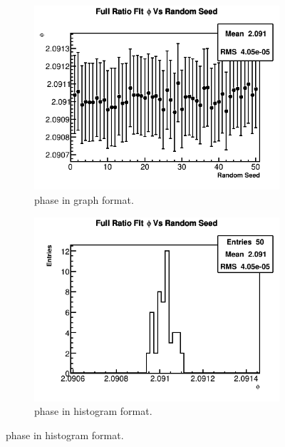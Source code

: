 \begin{figure}[]
		    \begin{subfigure}[t]{0.45\textwidth}
			    \centering
				\includegraphics[width=\textwidth]{RatioCBO_phi_Vs_Iter_Canv}
			    \caption{\gmtwo phase in graph format.}
		    \end{subfigure}
		    \hspace{4mm}
		    \begin{subfigure}[t]{0.45\textwidth}
			    \centering
				\includegraphics[width=\textwidth]{RatioCBO_phi_Vs_Iter_Canv_hist}
			    \caption{\gmtwo phase in histogram format.}
		    \end{subfigure}%
		   	\vspace{4mm}

\end{figure}
